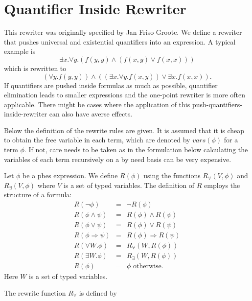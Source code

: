 \documentclass{article}
\newcommand{\vars}{\mathit{vars}}
\begin{document}
\newpage
\section{Quantifier Inside Rewriter}

This rewriter was originally specified by Jan Friso Groote.
We define a rewriter that pushes universal and existential quantifiers into an
expression. A typical example is
\[ \exists x.\forall y.(f(y,y)\wedge (f(x,y)\vee f(x,x))) \]
which is rewritten to
\[(\forall y.f(y,y)) \wedge ((\exists x.\forall y.f(x,y)) \vee \exists x.f(x,x)).\]
If quantifiers are pushed inside formulas as much as possible, quantifier elimination leads to smaller
expressions and the one-point rewriter is more often applicable. There might be cases where the
application of this push-quantifiers-inside-rewriter can also have averse effects.

Below the definition of the rewrite rules are given. It is assumed that it is cheap to obtain the
free variable in each term, which are denoted by $\vars(\phi)$ for a term $\phi$.
If not, care needs to be taken as in the formulation below calculating the
variables of each term recursively on a by need basis can be very expensive.

Let $\phi$ be a pbes expression. We
define $R(\phi)$ using the functions $R_{\forall}(V,\phi)$ and
$R_{\exists}(V,\phi)$ where $V$ is a set of typed variables. The
definition of $R$ employs the structure of a formula:
\begin{equation*}
\begin{array}{lll}
R(\neg \phi)&=&\neg R(\phi)\\
R(\phi\wedge \psi)&=&R(\phi)\wedge R(\psi)\\
R(\phi\vee\psi)&=&R(\phi)\vee R(\psi)\\
R(\phi\Rightarrow\psi)&=&R(\phi)\Rightarrow R(\psi)\\
R(\forall W.\phi)&=&R_{\forall}(W,R(\phi))\\
R(\exists W.\phi)&=&R_{\exists}(W,R(\phi))\\
R(\phi)&=&\phi\textrm{  otherwise}.
\end{array}
\end{equation*}
Here $W$ is a set of typed variables.

The rewrite function $R_{\forall}$ is defined by
\end{document}
